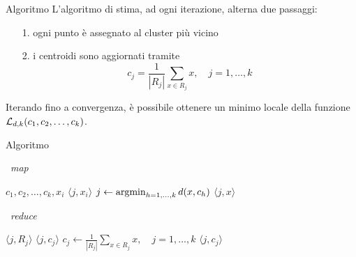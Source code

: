 \documentclass{beamer}
\begin{document}
\begin{frame}{Algoritmo \km}
    L'algoritmo di stima, ad ogni iterazione, alterna due passaggi:\\[.5cm]
    \begin{itemize}
        \item[1.] ogni punto è assegnato al cluster più vicino
        \item[2.] i centroidi sono aggiornati tramite
        \[
        c_j = \frac{1}{|R_j|}\sum_{x \in R_j} x, \quad j=1, \ldots, k
        \]
    \end{itemize}
    Iterando fino a convergenza, è possibile ottenere un minimo locale della funzione $ \mathcal{L}_{d,k}(c_1, c_2, \ldots, c_k)$.
\end{frame}


\begin{frame}{Algoritmo \km}
    \begin{algorithm}[H]
        \caption{\km\ \textit{map}}
        \begin{algorithmic}[1]
            \Require $c_1, c_2, \ldots, c_k, x_i$
            \Ensure $\big\langle j, x_i \big\rangle $
            \State $j \leftarrow \operatorname*{argmin}_{h = 1, \ldots, k} d(x, c_h)$
            \State \Return $\big\langle j, x \big\rangle $
        \end{algorithmic}
    \end{algorithm}
    \begin{algorithm}[H]
        \caption{\km\ \textit{reduce}}
        \begin{algorithmic}[1]
            \Require $\langle j, R_j \rangle $
            \Ensure $\langle j, c_j \rangle $
            \State $c_j \leftarrow \frac{1}{|R_j|}\sum_{x \in R_j} x, \quad j=1, \ldots, k$
            \State \Return $\langle j, c_j \rangle $
        \end{algorithmic}
    \end{algorithm}
\end{frame}

\end{document}
